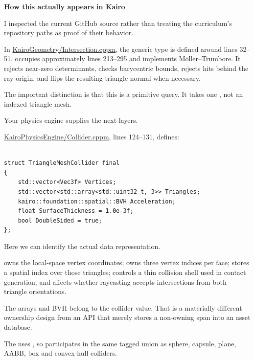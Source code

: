 \textbf{How this actually appears in Kairo}

I inspected the current GitHub source rather than treating the curriculum's repository paths as proof of their behavior.

In \href{https://github.com/swayam8624/KairoGeometry/blob/master/Intersection.cppm?utm_source=chatgpt.com}{KairoGeometry/Intersection.cppm}, the generic  type is defined around lines 32--51.  occupies approximately lines 213--295 and implements Möller--Trumbore. It rejects near-zero determinants, checks barycentric bounds, rejects hits behind the ray origin, and flips the resulting triangle normal when necessary.

The important distinction is that this is a primitive query. It takes one , not an indexed triangle mesh.

Your physics engine supplies the next layers.

\href{https://github.com/swayam8624/KairoPhysicsEngine/blob/main/Collider.cppm?utm_source=chatgpt.com}{KairoPhysicsEngine/Collider.cppm}, lines 124--131, defines:

\begin{verbatim}

struct TriangleMeshCollider final
{
    std::vector<Vec3f> Vertices;
    std::vector<std::array<std::uint32_t, 3>> Triangles;
    kairo::foundation::spatial::BVH Acceleration;
    float SurfaceThickness = 1.0e-3f;
    bool DoubleSided = true;
};
\end{verbatim}

Here we can identify the actual data representation.

 owns the local-space vertex coordinates;  owns three vertex indices per face;  stores a spatial index over those triangles;  controls a thin collision shell used in contact generation; and  affects whether raycasting accepts intersections from both triangle orientations.

The arrays and BVH belong to the collider value. That is a materially different ownership design from an API that merely stores a non-owning span into an asset database.

The  uses , so  participates in the same tagged union as sphere, capsule, plane, AABB, box and convex-hull colliders.

